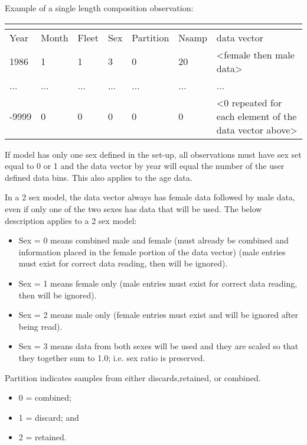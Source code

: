 Example of a single length composition observation:
\begin{center}
	\begin{tabular}{p{1.5cm} p{1.5cm} p{1.5cm} p{1.5cm} p{1.5cm} p{1.5cm} p{5cm}}
		\multicolumn{7}{l}{} \\
		\hline
		Year & Month & Fleet & Sex & Partition & Nsamp & data vector\Tstrut\Bstrut\\
		\hline
		1986 & 1 & 1 & 3 & 0 & 20 & <female then male data> \Tstrut\\
		... & ...& ... & ... & ...& ... & ... \\
-9999 & 0 & 0 & 0 & 0 & 0 & <0 repeated for each element of the data
vector above> \Bstrut\\
		\hline	
	\end{tabular}
\end{center}

If model has only one sex defined in the set-up, all observations must have sex set equal to 0 or 1 and the data vector by year will equal the number of the user defined data bins. This also applies to the age data. 

In a 2 sex model, the data vector always has female data followed by male data, even if only one of the two sexes has data that will be used. The below description applies to a 2 sex model:
	\begin{itemize}
		\item Sex = 0 means combined male and female (must already be combined and information placed in the female portion of the data vector) (male entries must exist for correct data reading, then will be ignored).
		\item Sex = 1 means female only (male entries must exist for correct data reading, then will be ignored).
		\item Sex = 2 means male only (female entries must exist and will be ignored after being read).
		\item Sex = 3 means data from both sexes will be used and they are scaled so that they together sum to 1.0; i.e. sex ratio is preserved.
	\end{itemize}

Partition indicates samples from either discards,retained, or combined.
	\begin{itemize}
		\item 0 = combined;
		\item 1 = discard; and
		\item 2 = retained.
	\end{itemize}

